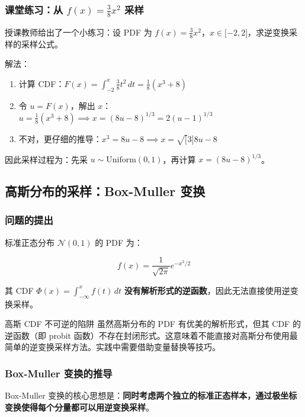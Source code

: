 \subsubsection{课堂练习：从 $f(x) = \frac{3}{8}x^2$ 采样}

授课教师给出了一个小练习：设 PDF 为 $f(x) = \frac{3}{8}x^2$，$x \in {[}-2, 2{]}$，求逆变换采样的采样公式。

解法：
\begin{enumerate}
    \item 计算 CDF：$F(x) = \int_{-2}^{x} \frac{3}{8}t^2 \, dt = \frac{1}{8}(x^3 + 8)$
    \item 令 $u = F(x)$，解出 $x$：$u = \frac{1}{8}(x^3 + 8) \implies x = (8u - 8)^{1/3} = 2(u-1)^{1/3}$
    \item 不对，更仔细的推导：$x^3 = 8u - 8 \implies x = \sqrt{[}3{]}{8u - 8}$
\end{enumerate}

因此采样过程为：先采 $u \sim \text{Uniform}(0,1)$，再计算 $x = (8u - 8)^{1/3}$。

\subsection{高斯分布的采样：Box-Muller 变换}

\subsubsection{问题的提出}

标准正态分布 $\mathcal{N}(0, 1)$ 的 PDF 为：

$$f(x) = \frac{1}{\sqrt{2\pi}} e^{-x^2/2}$$

其 CDF $\Phi(x) = \int_{-\infty}^{x} f(t) \, dt$ \textbf{没有解析形式的逆函数}，因此无法直接使用逆变换采样。

\begin{warningbox}{高斯 CDF 不可逆的陷阱}
虽然高斯分布的 PDF 有优美的解析形式，但其 CDF 的逆函数（即 probit 函数）不存在封闭形式。这意味着不能直接对高斯分布使用最简单的逆变换采样方法。实践中需要借助变量替换等技巧。
\end{warningbox}

\subsubsection{Box-Muller 变换的推导}

Box-Muller 变换的核心思想是：\textbf{同时考虑两个独立的标准正态样本，通过极坐标变换使得每个分量都可以用逆变换采样}。

